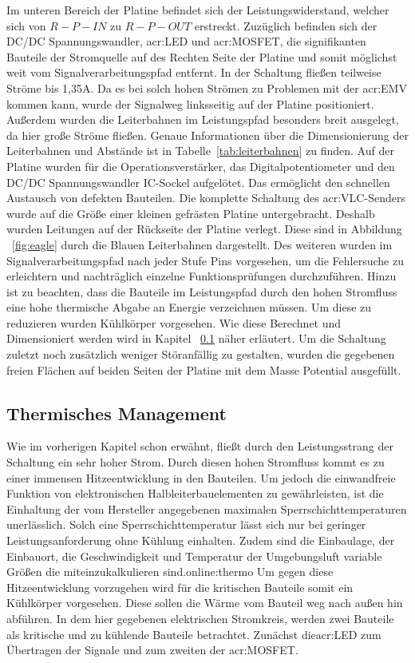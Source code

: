 Im unteren Bereich der Platine befindet sich der Leistungswiderstand, welcher sich von $R-P-IN$ zu $R-P-OUT$ erstreckt. Zuzüglich befinden sich der DC/DC Spannungswandler, \gls{acr:LED} und \gls{acr:MOSFET}, die signifikanten Bauteile der Stromquelle auf des Rechten Seite der Platine und somit möglichst weit vom Signalverarbeitungspfad entfernt. In der Schaltung fließen teilweise Ströme bis 1,35A. Da es bei solch hohen Strömen zu Problemen mit der   \gls{acr:EMV} kommen kann, wurde der Signalweg linksseitig auf der Platine positioniert. Außerdem wurden die Leiterbahnen im Leistungspfad besonders breit ausgelegt, da hier große Ströme fließen. Genaue Informationen über die Dimensionierung der Leiterbahnen und Abstände ist in Tabelle~\ref{tab:leiterbahnen} zu finden. Auf der Platine wurden für die Operationsverstärker, das Digitalpotentiometer und den DC/DC Spannungswandler IC-Sockel aufgelötet. Das ermöglicht den schnellen Austausch von defekten Bauteilen. Die komplette Schaltung des \gls{acr:VLC}-Senders wurde auf die Größe einer kleinen gefrästen Platine untergebracht. Deshalb wurden Leitungen auf der Rückseite der Platine verlegt. Diese sind in Abbildung ~\ref{fig:eagle} durch die Blauen Leiterbahnen dargestellt. Des weiteren wurden im Signalverarbeitungspfad nach jeder Stufe Pins vorgesehen, um die Fehlersuche zu erleichtern und nachträglich einzelne Funktionsprüfungen durchzuführen. Hinzu ist zu beachten, dass die Bauteile im Leistungspfad durch den hohen Stromfluss eine hohe thermische Abgabe an Energie verzeichnen müssen. Um diese zu reduzieren wurden Kühlkörper vorgesehen. Wie diese Berechnet und Dimensioniert werden wird in Kapitel ~\ref{subsub:thermo} näher erläutert. Um die Schaltung zuletzt noch zusätzlich weniger Störanfällig zu gestalten, wurden die gegebenen freien Flächen auf beiden Seiten der Platine mit dem Masse Potential ausgefüllt. 

\subsection{Thermisches Management}
\label{subsub:thermo}
Wie im vorherigen Kapitel schon erwähnt, fließt durch den Leistungsstrang der Schaltung ein sehr hoher Strom. Durch diesen hohen Stromfluss kommt es zu einer immensen Hitzeentwicklung in den Bauteilen. Um jedoch die einwandfreie Funktion von elektronischen Halbleiterbauelementen zu gewährleisten, ist die Einhaltung der vom Hersteller angegebenen maximalen Sperrschichttemperaturen unerlässlich. Solch eine Sperrschichttemperatur lässt sich nur bei geringer Leistungsanforderung ohne Kühlung einhalten. Zudem sind die Einbaulage, der Einbauort, die Geschwindigkeit und Temperatur der Umgebungsluft variable Größen die miteinzukalkulieren sind.\gls{online:thermo}
Um gegen diese Hitzeentwicklung vorzugehen wird für die kritischen Bauteile somit ein Kühlkörper vorgesehen. Diese sollen die Wärme vom Bauteil weg nach außen hin abführen. In dem hier gegebenen elektrischen Stromkreis, werden zwei Bauteile als kritische und zu kühlende Bauteile betrachtet. Zunächst die\gls{acr:LED} zum Übertragen der Signale und zum zweiten der \gls{acr:MOSFET}.\cite{thermLED}


